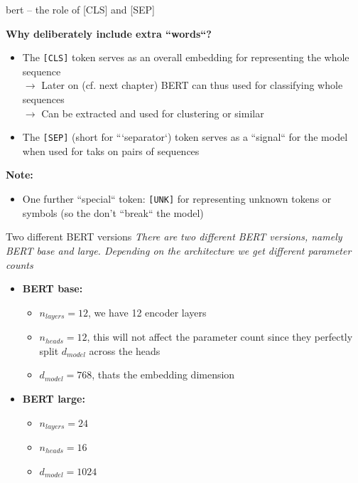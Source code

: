 \begin{frame}{bert -- the role of [CLS] and [SEP]}

\vfill

\textbf{Why deliberately include extra ``words``?}

\begin{itemize}
	\item The \texttt{[CLS]} token serves as an overall embedding for representing the whole sequence\\
				$\to$ Later on (cf. next chapter) BERT can thus used for classifying whole sequences\\
				$\to$ Can be extracted and used for clustering or similar
	\item The \texttt{[SEP]} (short for ```separator`) token serves as a ``signal`` for the model when used for taks on pairs of sequences
\end{itemize}

\textbf{Note:}

\begin{itemize}
	\item One further ``special`` token: \texttt{[UNK]} for representing unknown tokens or symbols (so the don't ``break`` the model)
\end{itemize}

\vfill

\end{frame}


\begin{frame}{Two different BERT versions}
\textit{There are two different BERT versions, namely BERT base and large. Depending on the architecture we get different parameter counts} 

\begin{itemize}
	\item \textbf{BERT base:}
	\begin{itemize}
		\item $n_{layers} = 12$, we have 12 encoder layers
		\item $n_{heads} = 12$, this will not affect the parameter count since they perfectly split $d_{model}$ across the heads
		\item $d_{model} = 768$, thats the embedding dimension
	\end{itemize}

	\item \textbf{BERT large:}
	\begin{itemize}
		\item $n_{layers} = 24$
		\item $n_{heads} = 16$
		\item $d_{model} = 1024$
	\end{itemize}
\end{itemize}
	
\end{frame}

